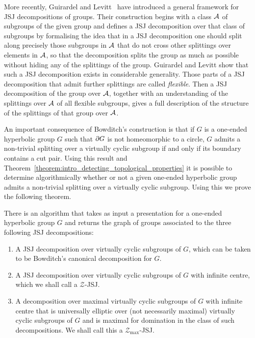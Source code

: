 More recently, Guirardel and Levitt~\cite{guirardellevitt17} have introduced a general framework for JSJ decompositions of groups.
Their construction begins with a class $\mathcal{A}$ of subgroups of the given group and defines a JSJ decomposition over that class of subgroups by formalising the idea that in a JSJ decomposition one should split along precisely those subgroups in $\mathcal{A}$ that do not cross other splittings over elements in $\mathcal{A}$, so that the decomposition splits the group as much as possible without hiding any of the splittings of the group.
Guirardel and Levitt show that such a JSJ decomposition exists in considerable generality.
Those parts of a JSJ decomposition that admit further splittings are called \emph{flexible}.
Then a JSJ decomposition of the group over $\mathcal{A}$, together with an understanding of the splittings over $\mathcal{A}$ of all flexible subgroups, gives a full description of the structure of the splittings of that group over $\mathcal{A}$.

An important consequence of Bowditch's construction is that if $G$ is a one-ended hyperbolic group $G$ such that $\partial G$ is not homeomorphic to a circle, $G$ admits a non-trivial splitting over a virtually cyclic subgroup if and only if its boundary contains a cut pair.
Using this result and Theorem~\ref{theorem:intro_detecting_topological_properties} it is possible to determine algorithmically whether or not a given one-ended hyperbolic group admits a non-trivial splitting over a virtually cyclic subgroup.
Using this we prove the following theorem.

\begin{theorem}\label{theorem:computing_JSJ_decompositions} 
 There is an algorithm that takes as input a presentation for a one-ended hyperbolic group $G$ and returns the graph of groups associated to the three following JSJ decompositions:
 \begin{enumerate}
  \item A JSJ decomposition over virtually cyclic subgroups of $G$, which can be taken to be Bowditch's canonical decomposition for $G$.
  \item A JSJ decomposition over virtually cyclic subgroups of $G$ with infinite centre, which we shall call a $\mathcal{Z}$-JSJ.
  \item A decomposition over maximal virtually cyclic subgroups of $G$ with infinite centre that is universally elliptic over (not necessarily maximal) virtually cyclic subgroups of $G$ and is maximal for domination in the class of such decompositions. 
   We shall call this a $\mathcal{Z}_\text{max}$-JSJ.
 \end{enumerate}
\end{theorem}

